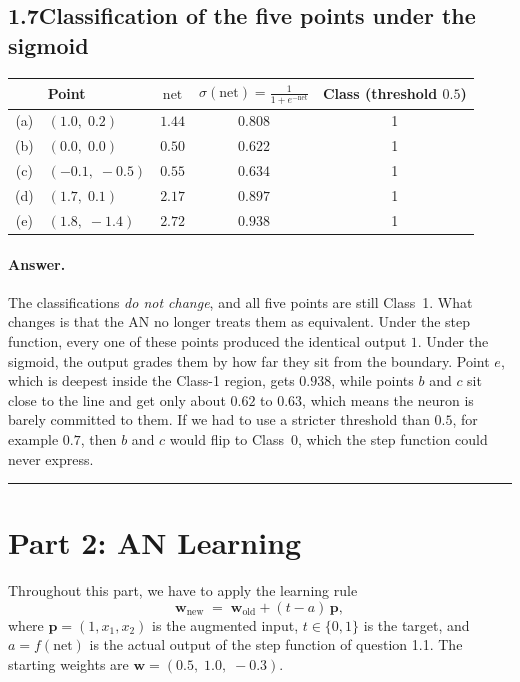\documentclass[11pt]{article}
\newcommand{\net}{\mathrm{net}}
\newcommand{\bw}{\mathbf{w}}
\newcommand{\bp}{\mathbf{p}}
\begin{document}
\subsection*{1.7\quad Classification of the five points under the sigmoid}

\begin{table}[H]
\centering
\begin{tabular}{clccc}
\toprule
& Point & $\net$ & $\sigma(\net) = \frac{1}{1+e^{-\net}}$ & Class (threshold $0.5$) \\
\midrule
(a) & $(1.0,\;0.2)$   & $1.44$ & $0.808$ & 1 \\
(b) & $(0.0,\;0.0)$   & $0.50$ & $0.622$ & 1 \\
(c) & $(-0.1,\;-0.5)$ & $0.55$ & $0.634$ & 1 \\
(d) & $(1.7,\;0.1)$   & $2.17$ & $0.897$ & 1 \\
(e) & $(1.8,\;-1.4)$  & $2.72$ & $0.938$ & 1 \\
\bottomrule
\end{tabular}
\end{table}

\paragraph{Answer.} The classifications \emph{do not change}, and all five points are still
Class~1. What changes is that the AN no longer treats them as equivalent. Under the step
function, every one of these points produced the identical output $1$. Under the sigmoid,
the output grades them by how far they sit from the boundary. Point $e$, which is deepest
inside the Class-1 region, gets $0.938$, while points $b$ and $c$ sit close to the line and
get only about $0.62$ to $0.63$, which means the neuron is barely committed to them. If we
had to use a stricter threshold than $0.5$, for example $0.7$, then $b$ and $c$ would flip
to Class~0, which the step function could never express.

\bigskip
\noindent\rule{\textwidth}{0.4pt}

\section*{Part 2: AN Learning}

Throughout this part, we have to apply the learning rule
\[
\bw_{\text{new}} \;=\; \bw_{\text{old}} + (t - a)\,\bp ,
\]
where $\bp = (1, x_1, x_2)$ is the augmented input, $t \in \{0,1\}$ is the target, and
$a = f(\net)$ is the actual output of the step function of question 1.1. The starting
weights are $\bw = (0.5,\;1.0,\;-0.3)$.
\end{document}
